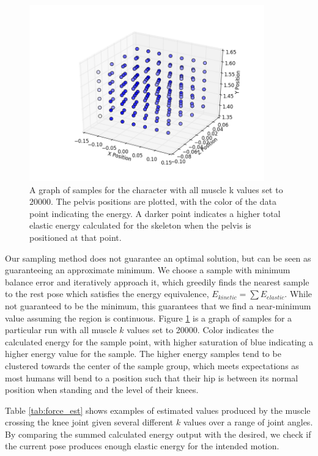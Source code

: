 \begin{figure}[ht]
	\centering
	\includegraphics[width=4in]{images/K200000_global_dense.png}
	\caption[A plot of a sample field for energy based simulation]{A graph of samples for the character with all muscle k values set to $20000$.  The pelvis positions are plotted, with the color of the data point indicating the energy.  A darker point indicates a higher total elastic energy calculated for the skeleton when the pelvis is positioned at that point.}
	\label{fig:energy_samples}
\end{figure}

Our sampling method does not guarantee an optimal solution, but can be seen as guaranteeing an approximate minimum.  We choose a sample with minimum balance error and iteratively approach it, which greedily finds the nearest sample to the rest pose which satisfies the energy equivalence, $E_{kinetic} = \displaystyle\sum E_{elastic}$.  While not guaranteed to be the minimum, this guarantees that we find a near-minimum value assuming the region is continuous.  Figure \ref{fig:energy_samples} is a graph of samples for a particular run with all muscle $k$ values set to 20000.  Color indicates the calculated energy for the sample point, with higher saturation of blue indicating a higher energy value for the sample.  The higher energy samples tend to be clustered towards the center of the sample group, which meets expectations as most humans will bend to a position such that their hip is between its normal position when standing and the level of their knees.

Table \ref{tab:force_est} shows examples of estimated values produced by the muscle crossing the knee joint given several different $k$ values over a range of joint angles.  By comparing the summed calculated energy output with the desired, we check if the current pose produces enough elastic energy for the intended motion.

